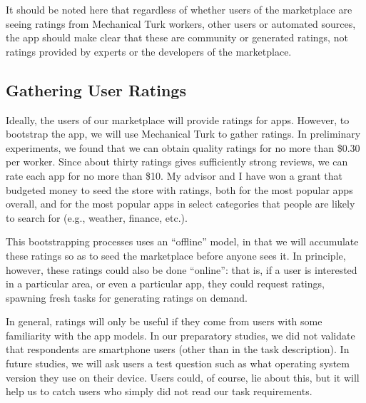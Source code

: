 \documentclass[11pt]{article}
\begin{document}
It should be noted here that regardless of whether users of the
marketplace are seeing ratings from Mechanical Turk workers, other
users or automated sources, the app should make clear that these 
are community or generated ratings, not
ratings provided by experts or the developers of the marketplace.


\subsection{Gathering User Ratings}
\label{subsec-gather-ratings}

Ideally, the users of our marketplace will provide ratings for
apps. However, 
to bootstrap the app, we will use Mechanical Turk to gather
ratings. In preliminary experiments, we found that we can obtain
quality ratings for no more than \$0.30 per worker. Since about thirty
ratings gives sufficiently strong reviews, we can rate each
app for no more than \$10. 
My advisor and I have won a grant that  budgeted money to
seed the store with ratings, both for the most popular apps overall,
and for the most popular apps in select categories that people are
likely to search for (e.g., weather, finance, etc.).

This bootstrapping processes uses an ``offline'' model, in that we 
will accumulate these ratings so as to seed the marketplace before anyone
sees it. In principle, however, these ratings could also be done
``online'': that is, if a user is interested in a particular area, or
even a particular app, they could request ratings, spawning fresh tasks for
generating ratings on demand. 

In general, ratings will only be useful if they come from users with some
familiarity with the app models.
In our preparatory studies, we did not validate that respondents are
smartphone users (other than in the task description). In future
studies, we will ask users a test question such as what operating
system version they use on their device. Users could, of course, lie
about this, but it will help us to catch users who simply did not read
our task requirements.
\end{document}

